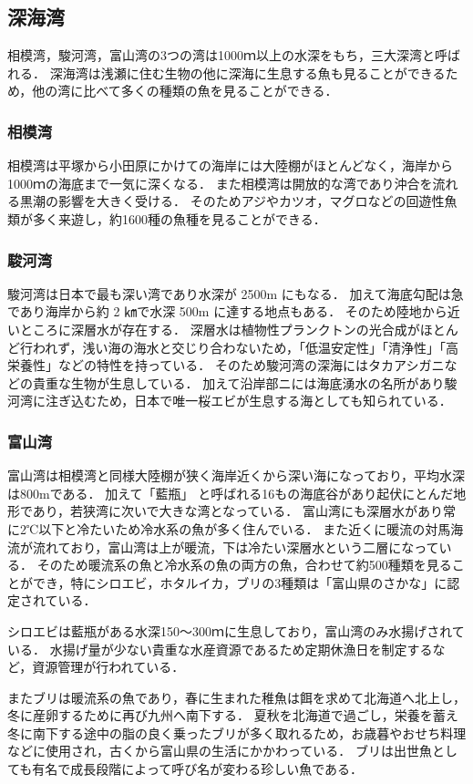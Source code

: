 \documentclass[12pt,a4j,titlepage]{ltjsarticle}
\begin{document}
\subsection{深海湾}
相模湾，駿河湾，富山湾の3つの湾は1000ｍ以上の水深をもち，三大深湾と呼ばれる．
深海湾は浅瀬に住む生物の他に深海に生息する魚も見ることができるため，他の湾に比べて多くの種類の魚を見ることができる．
\subsubsection{相模湾}
相模湾は平塚から小田原にかけての海岸には大陸棚がほとんどなく，海岸から1000ｍの海底まで一気に深くなる．
また相模湾は開放的な湾であり沖合を流れる黒潮の影響を大きく受ける．
そのためアジやカツオ，マグロなどの回遊性魚類が多く来遊し，約1600種の魚種を見ることができる\cite{sagami}．
\subsubsection{駿河湾}
駿河湾は日本で最も深い湾であり水深が 2500m にもなる\cite{suruga}．
加えて海底勾配は急であり海岸から約 2 ㎞で水深 500m に達する地点もある．
そのため陸地から近いところに深層水が存在する．
深層水は植物性プランクトンの光合成がほとんど行われず，浅い海の海水と交じり合わないため，「低温安定性」「清浄性」「高栄養性」などの特性を持っている．
そのため駿河湾の深海にはタカアシガニなどの貴重な生物が生息している．
加えて沿岸部ニには海底湧水の名所があり駿河湾に注ぎ込むため，日本で唯一桜エビが生息する海としても知られている．
\subsubsection{富山湾}
富山湾は相模湾と同様大陸棚が狭く海岸近くから深い海になっており，平均水深は800mである\cite{toyama}．
加えて「藍瓶」 と呼ばれる16もの海底谷があり起伏にとんだ地形であり，若狭湾に次いで大きな湾となっている．
富山湾にも深層水があり常に2℃以下と冷たいため冷水系の魚が多く住んでいる．
また近くに暖流の対馬海流が流れており，富山湾は上が暖流，下は冷たい深層水という二層になっている．
そのため暖流系の魚と冷水系の魚の両方の魚，合わせて約500種類を見ることができ，特にシロエビ，ホタルイカ，ブリの3種類は「富山県のさかな」に認定されている．\par
シロエビは藍瓶がある水深150～300ｍに生息しており，富山湾のみ水揚げされている．
水揚げ量が少ない貴重な水産資源であるため定期休漁日を制定するなど，資源管理が行われている．\par
またブリは暖流系の魚であり，春に生まれた稚魚は餌を求めて北海道へ北上し，冬に産卵するために再び九州へ南下する．
夏秋を北海道で過ごし，栄養を蓄え冬に南下する途中の脂の良く乗ったブリが多く取れるため，お歳暮やおせち料理などに使用され，古くから富山県の生活にかかわっている．
ブリは出世魚としても有名で成長段階によって呼び名が変わる珍しい魚である．
\end{document}
